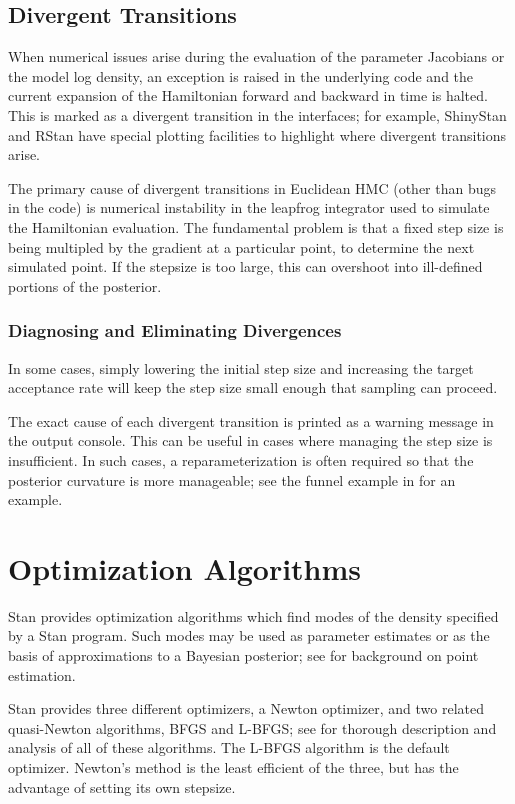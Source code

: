 \section{Divergent Transitions}

When numerical issues arise during the evaluation of the parameter
Jacobians or the model log density, an exception is raised in the
underlying code and the current expansion of the Hamiltonian forward
and backward in time is halted.  This is marked as a divergent
transition in the interfaces;  for example, ShinyStan and RStan have
special plotting facilities to highlight where divergent transitions
arise.

The primary cause of divergent transitions in Euclidean HMC (other
than bugs in the code) is numerical instability in the leapfrog
integrator used to simulate the Hamiltonian evaluation.  The
fundamental problem is that a fixed step size is being multipled by
the gradient at a particular point, to determine the next simulated
point.  If the stepsize is too large, this can overshoot into
ill-defined portions of the posterior.  

\subsection{Diagnosing and Eliminating Divergences}

In some cases, simply lowering the initial step size and increasing
the target acceptance rate will keep the step size small enough that
sampling can proceed.  

The exact cause of each divergent transition is printed as a warning
message in the output console.  This can be useful in cases where
managing the step size is insufficient.  In such cases, a
reparameterization is often required so that the posterior curvature
is more manageable; see the funnel example in
 for an example.


\chapter{Optimization  Algorithms}%
\label{optimization-algorithms.chapter}

\noindent
Stan provides optimization algorithms which find modes of the density
specified by a Stan program. Such modes may be used as parameter
estimates or as the basis of approximations to a Bayesian posterior;
see  for background on point estimation.

Stan provides three different optimizers, a Newton optimizer, and two
related quasi-Newton algorithms, BFGS and L-BFGS; see
\citep{NocedalWright:2006} for thorough description and analysis of
all of these algorithms. The L-BFGS algorithm is the default
optimizer. Newton's method is the least efficient of the three, but
has the advantage of setting its own stepsize.

